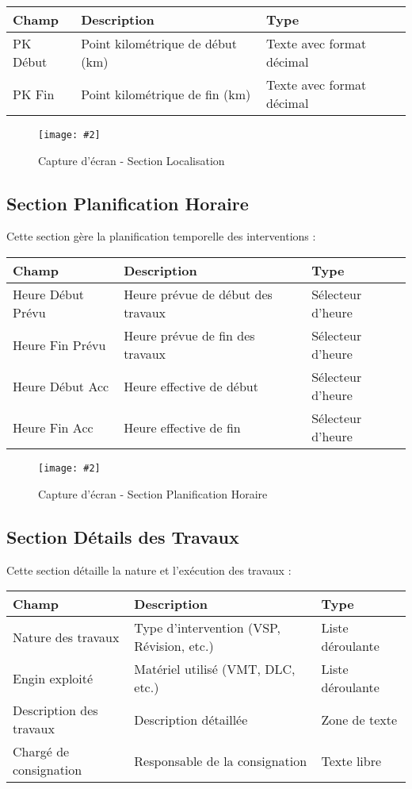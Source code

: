 \documentclass[12pt,a4paper]{report}
\newcommand{\screenshot}[3][]{%
\begin{figure}[H]
\centering
\texttt{[image: \#2]}
\caption{#3}
\end{figure}
}
\begin{document}
\begin{table}[H]
\centering
\begin{tabular}{|p{3cm}|p{8cm}|p{3cm}|}
\hline
\textbf{Champ} & \textbf{Description} & \textbf{Type} \\
\hline
PK Début & Point kilométrique de début (km) & Texte avec format décimal \\
\hline
PK Fin & Point kilométrique de fin (km) & Texte avec format décimal \\
\hline
\end{tabular}
\end{table}

\screenshot{localisation.png}{Capture d'écran - Section Localisation}

\subsection{Section Planification Horaire}

Cette section gère la planification temporelle des interventions :

\begin{table}[H]
\centering
\begin{tabular}{|p{4cm}|p{7cm}|p{3cm}|}
\hline
\textbf{Champ} & \textbf{Description} & \textbf{Type} \\
\hline
Heure Début Prévu & Heure prévue de début des travaux & Sélecteur d'heure \\
\hline
Heure Fin Prévu & Heure prévue de fin des travaux & Sélecteur d'heure \\
\hline
Heure Début Acc & Heure effective de début & Sélecteur d'heure \\
\hline
Heure Fin Acc & Heure effective de fin & Sélecteur d'heure \\
\hline
\end{tabular}
\end{table}

\screenshot{cat_horaire.png}{Capture d'écran - Section Planification Horaire}

\subsection{Section Détails des Travaux}

Cette section détaille la nature et l'exécution des travaux :

\begin{table}[H]
\centering
\begin{tabular}{|p{3cm}|p{8cm}|p{3cm}|}
\hline
\textbf{Champ} & \textbf{Description} & \textbf{Type} \\
\hline
Nature des travaux & Type d'intervention (VSP, Révision, etc.) & Liste déroulante \\
\hline
Engin exploité & Matériel utilisé (VMT, DLC, etc.) & Liste déroulante \\
\hline
Description des travaux & Description détaillée & Zone de texte \\
\hline
Chargé de consignation & Responsable de la consignation & Texte libre \\
\hline
\end{tabular}
\end{table}
\end{document}
